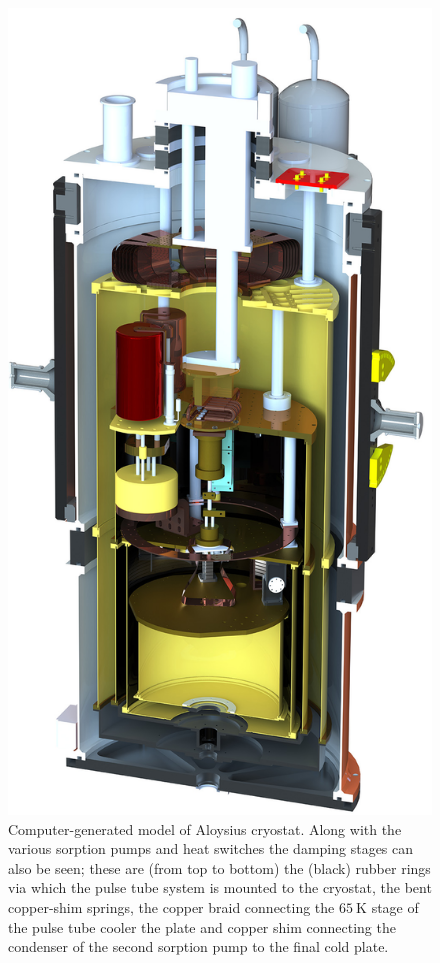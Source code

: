 \begin{figure}[tb]
\begin{center}
\includegraphics[height = 0.5\textheight]{figures/Aloysius1920}
\caption[Computer-generated model of Aloysius cryostat]{Computer-generated model of Aloysius cryostat. Along with the various sorption pumps and heat switches the damping stages can also be seen; these are (from top to bottom) the (black) rubber rings via which the pulse tube system is mounted to the cryostat, the bent copper-shim springs, the copper braid connecting the $65~\mathrm{K}$ stage of the pulse tube cooler the plate and copper shim connecting the condenser of the second  sorption pump to the final cold plate.}
\label{fig:Aloysius}
\end{center}
\end{figure}
